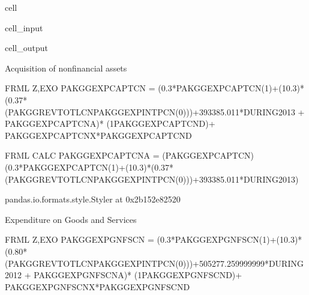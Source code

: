 \documentclass[letterpaper,10pt,english]{jupyterBook}
\begin{document}
\begin{sphinxuseclass}{cell}\begin{sphinxVerbatimInput}

\begin{sphinxuseclass}{cell_input}
\begin{sphinxVerbatim}[commandchars=\\\{\}]
 
\end{sphinxVerbatim}

\end{sphinxuseclass}\end{sphinxVerbatimInput}
\begin{sphinxVerbatimOutput}

\begin{sphinxuseclass}{cell_output}
\begin{sphinxVerbatim}[commandchars=\\\{\}]
Acquisition of non\PYGZhy{}financial assets

FRML \PYGZlt{}Z,EXO\PYGZgt{} PAKGGEXPCAPTCN = (0.3*PAKGGEXPCAPTCN(\PYGZhy{}1)+(1\PYGZhy{}0.3)*(0.37*(PAKGGREVTOTLCN\PYGZhy{}PAKGGEXPINTPCN(\PYGZhy{}0)))+393385.011*DURING\PYGZus{}2013 + PAKGGEXPCAPTCN\PYGZus{}A)* (1\PYGZhy{}PAKGGEXPCAPTCN\PYGZus{}D)+ PAKGGEXPCAPTCN\PYGZus{}X*PAKGGEXPCAPTCN\PYGZus{}D  \PYGZdl{}

FRML \PYGZlt{}CALC\PYGZgt{} PAKGGEXPCAPTCN\PYGZus{}A = (PAKGGEXPCAPTCN) \PYGZhy{} (0.3*PAKGGEXPCAPTCN(\PYGZhy{}1)+(1\PYGZhy{}0.3)*(0.37*(PAKGGREVTOTLCN\PYGZhy{}PAKGGEXPINTPCN(\PYGZhy{}0)))+393385.011*DURING\PYGZus{}2013)\PYGZdl{}
\end{sphinxVerbatim}

\begin{sphinxVerbatim}[commandchars=\\\{\}]
\PYGZlt{}pandas.io.formats.style.Styler at 0x2b152e82520\PYGZgt{}
\end{sphinxVerbatim}

\begin{sphinxVerbatim}[commandchars=\\\{\}]
Expenditure on Goods and Services

FRML \PYGZlt{}Z,EXO\PYGZgt{} PAKGGEXPGNFSCN = (0.3*PAKGGEXPGNFSCN(\PYGZhy{}1)+(1\PYGZhy{}0.3)*(0.80*(PAKGGREVTOTLCN\PYGZhy{}PAKGGEXPINTPCN(\PYGZhy{}0)))+505277.259999999*DURING\PYGZus{}2012 + PAKGGEXPGNFSCN\PYGZus{}A)* (1\PYGZhy{}PAKGGEXPGNFSCN\PYGZus{}D)+ PAKGGEXPGNFSCN\PYGZus{}X*PAKGGEXPGNFSCN\PYGZus{}D  \PYGZdl{}


\end{sphinxVerbatim}
\end{sphinxuseclass}
\end{sphinxVerbatimOutput}
\end{sphinxuseclass}
\end{document}
